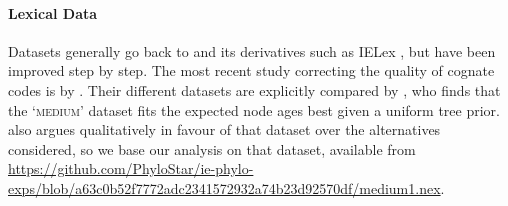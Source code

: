 \documentclass[a4paper,12pt]{scrartcl}
\begin{document}
\paragraph{Lexical Data}
Datasets generally go back to \textcite{dyen1997comparative} and its derivatives such as IELex \parencite{ielex},
but have been improved
step by step. The most recent study correcting
the quality of cognate codes is by \textcite{chang2015ancestryconstrained}. Their different datasets are explicitly compared by \textcite{rama2018three}, who finds that the
‘\textsc{medium}’ dataset fits the expected node ages best given a uniform tree prior.  also argues qualitatively in favour of
that dataset over the alternatives considered, so we base our analysis on that dataset, available from
\url{https://github.com/PhyloStar/ie-phylo-exps/blob/a63c0b52f7772adc2341572932a74b23d92570df/medium1.nex}.
\end{document}
